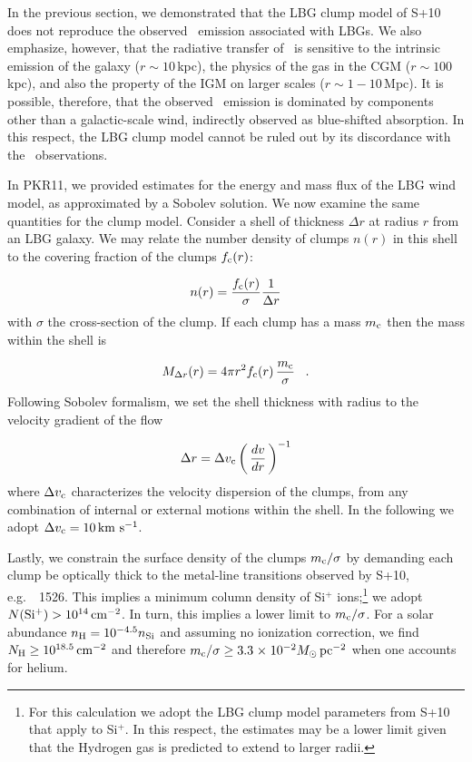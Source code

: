 \documentclass[12pt,preprint]{aastex}
\begin{document}
In the previous section, we demonstrated that the LBG clump model
of S+10 does not reproduce the observed \lya\ emission associated with
LBGs.   We also emphasize, however, that the radiative transfer of
\lya\ is sensitive to the intrinsic emission of the galaxy ($r \sim
10$\,kpc), the physics of the gas in the CGM ($r \sim 100$\,kpc), and
also the property of the IGM on larger scales ($r \sim 1-10$\,Mpc).
It is possible, therefore, that the observed \lya\ emission is
dominated by components other than a galactic-scale wind, indirectly
observed as blue-shifted absorption.  In this respect, the LBG clump
model cannot be ruled out by its discordance with the \lya\
observations.

In PKR11, we provided estimates for the energy and mass flux of the
LBG wind model, as approximated by a Sobolev solution.  We now
examine the same quantities for the clump model.  Consider a shell of
thickness $\Delta r$ at radius $r$ from an LBG galaxy.  We may relate
the number density of clumps $n(r)$ in this shell to the covering
fraction of the clumps $f_{\rm c}(r)$:

\begin{equation}
n(r) = \frac{f_{\rm c}(r)}{\sigma} \frac{1}{\Delta r}
\label{eqn:density}
\end{equation}
with $\sigma$ the cross-section of the clump.  If each clump has a
mass $m_{\rm c}$ then the mass within the shell is

\begin{equation}
M_{\Delta r}(r) = 4\pi r^2 f_{\rm c}(r) \, \frac{m_{\rm c}}{\sigma}
\;\;\; .
\label{eqn:mshell}
\end{equation}
Following Sobolev formalism, we set the shell thickness with radius to
the velocity gradient of the flow

\begin{equation}
\Delta r = \Delta v_{\rm c} \left ( \, \frac{dv}{dr} \, \right )^{-1}
\end{equation}
where $\Delta v_{\rm c}$ characterizes the velocity dispersion of the
clumps, from any combination of internal or external motions within
the shell.  In the following we adopt $\Delta v_{\rm c} = 10 \, {\rm km~s^{-1}}$.

Lastly, we constrain the surface density of the clumps $m_{\rm
  c}/\sigma$ by demanding each clump be optically thick to the
metal-line transitions observed by S+10, e.g.\ ~1526.  
This implies a minimum column density of Si$^+$ ions;\footnote{For this
  calculation we adopt the LBG clump model parameters from S+10 that
  apply to Si$^+$.  In this respect, the estimates may be a lower
  limit given that the Hydrogen gas is predicted to extend to larger
  radii.} 
we adopt
${N({\rm Si^+})} > 10^{14} \, {\rm cm^{-2}}$.  In turn, this implies a lower limit to
$m_{\rm c}/\sigma$.  For a solar abundance $n_{\rm H} = 10^{-4.5}
n_{\rm Si}$ and assuming no ionization correction, we find $N_{\rm H}
\ge 10^{18.5} \, {\rm cm^{-2}}$ and therefore $m_{\rm c} / \sigma \ge 3.3
{\; \times \; 10^{-2}} M_\odot \, \rm pc^{-2}$ when one accounts for helium.
\end{document}
